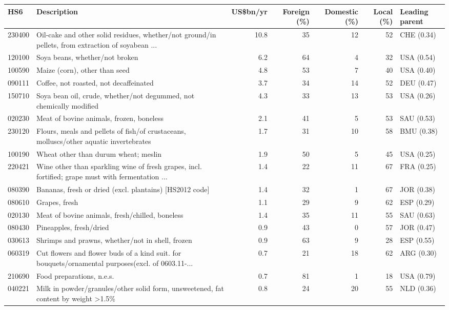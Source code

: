 \begin{tabular}{@{}l p{6.4cm} r r r r l@{}}
\toprule
HS6 & Description & US\$bn/yr & Foreign (\%) & Domestic (\%) & Local (\%) & Leading parent \\
\midrule
230400 & Oil-cake and other solid residues, whether/\allowbreak{}not ground/\allowbreak{}in pellets, from extraction of soyabean ... & 10.8 & 35 & 12 & 52 & CHE (0.34) \\
120100 & Soya beans, whether/\allowbreak{}not broken & 6.2 & 64 & 4 & 32 & USA (0.54) \\
100590 & Maize (corn), other than seed & 4.8 & 53 & 7 & 40 & USA (0.40) \\
090111 & Coffee, not roasted, not decaffeinated & 3.7 & 34 & 14 & 52 & DEU (0.47) \\
150710 & Soya bean oil, crude, whether/\allowbreak{}not degummed, not chemically modified & 4.3 & 33 & 13 & 53 & USA (0.26) \\
020230 & Meat of bovine animals, frozen, boneless & 2.1 & 41 & 5 & 53 & SAU (0.53) \\
230120 & Flours, meals and pellets of fish/\allowbreak{}of crustaceans, molluscs/\allowbreak{}other aquatic invertebrates & 1.7 & 31 & 10 & 58 & BMU (0.38) \\
100190 & Wheat other than durum wheat; meslin & 1.9 & 50 & 5 & 45 & USA (0.25) \\
220421 & Wine other than sparkling wine of fresh grapes, incl. fortified; grape must with fermentation ... & 1.4 & 22 & 11 & 67 & FRA (0.25) \\
080390 & Bananas, fresh or dried (excl. plantains) [HS2012 code] & 1.4 & 32 & 1 & 67 & JOR (0.38) \\
080610 & Grapes, fresh & 1.1 & 29 & 9 & 62 & ESP (0.29) \\
020130 & Meat of bovine animals, fresh/\allowbreak{}chilled, boneless & 1.4 & 35 & 11 & 55 & SAU (0.63) \\
080430 & Pineapples, fresh/\allowbreak{}dried & 0.9 & 43 & 0 & 57 & JOR (0.47) \\
030613 & Shrimps and prawns, whether/\allowbreak{}not in shell, frozen & 0.9 & 63 & 9 & 28 & ESP (0.55) \\
060319 & Cut flowers and flower buds of a kind suit. for bouquets/\allowbreak{}ornamental purposes(excl. of 0603.11-... & 0.7 & 21 & 18 & 62 & ARG (0.30) \\
210690 & Food preparations, n.e.s. & 0.7 & 81 & 1 & 18 & USA (0.79) \\
040221 & Milk in powder/\allowbreak{}granules/\allowbreak{}other solid form, unsweetened, fat content by weight >1.5\% & 0.8 & 24 & 20 & 55 & NLD (0.36) \\

\end{tabular}
